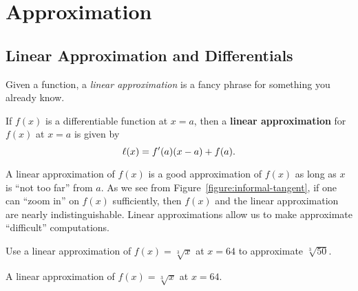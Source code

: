 \chapter{Approximation}

\section{Linear Approximation and Differentials}



Given a function, a \textit{linear approximation} is a fancy phrase
for something you already know.

\begin{definition}
If $f(x)$ is a differentiable function at $x=a$, then a \textbf{linear
  approximation} for $f(x)$ at $x=a$ is given by
\[
\ell(x) = f'(a)(x-a) +f(a).
\]
\end{definition}

A linear approximation of $f(x)$ is a good approximation of $f(x)$ as
long as $x$ is ``not too far'' from $a$.  As we see from
Figure~\ref{figure:informal-tangent}, if one can ``zoom in'' on $f(x)$
sufficiently, then $f(x)$ and the linear approximation are nearly
indistinguishable. Linear approximations allow us to make approximate
``difficult'' computations.

\begin{example}
Use a linear approximation of $f(x) =\sqrt[3]{x}$ at $x=64$ to
approximate $\sqrt[3]{50}$.
\end{example}



\begin{marginfigure}
\caption{A linear approximation of $f(x) = \sqrt[3]{x}$ at $x=64$.}
\label{figure:la sqrt3x}
\end{marginfigure}


